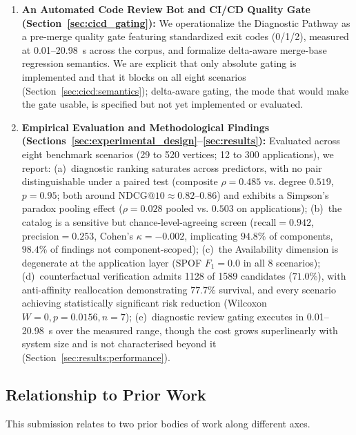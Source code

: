 \begin{enumerate}
    \item \textbf{An Automated Code Review Bot and CI/CD Quality Gate (Section~\ref{sec:cicd_gating}):} We operationalize the Diagnostic Pathway as a pre-merge quality gate featuring standardized exit codes (0/1/2), measured at 0.01--20.98~s across the corpus, and formalize delta-aware merge-base regression semantics. We are explicit that only absolute gating is implemented and that it blocks on all eight scenarios (Section~\ref{sec:cicd:semantics}); delta-aware gating, the mode that would make the gate usable, is specified but not yet implemented or evaluated.
    \item \textbf{Empirical Evaluation and Methodological Findings (Sections~\ref{sec:experimental_design}--\ref{sec:results}):} Evaluated across eight benchmark scenarios (29 to 520 vertices; 12 to 300 applications), we report: (a)~diagnostic ranking saturates across predictors, with no pair distinguishable under a paired test (composite $\rho = 0.485$ vs. degree $0.519$, $p = 0.95$; both around $\mathrm{NDCG@10} \approx 0.82$--$0.86$) and exhibits a Simpson's paradox pooling effect ($\rho = 0.028$ pooled vs. $0.503$ on applications); (b)~the catalog is a sensitive but chance-level-agreeing screen ($\text{recall} = 0.942$, $\text{precision} = 0.253$, Cohen's $\kappa = -0.002$, implicating $94.8\%$ of components, $98.4\%$ of findings not component-scoped); (c)~the Availability dimension is degenerate at the application layer (SPOF $F_1 = 0.0$ in all 8 scenarios); (d)~counterfactual verification admits 1128 of 1589 candidates ($71.0\%$), with anti-affinity reallocation demonstrating $77.7\%$ survival, and every scenario achieving statistically significant risk reduction (Wilcoxon $W=0, p=0.0156, n=7$); (e)~diagnostic review gating executes in 0.01--20.98~s over the measured range, though the cost grows superlinearly with system size and is not characterised beyond it (Section~\ref{sec:results:performance}).
\end{enumerate}

\subsection{Relationship to Prior Work}
\label{sec:intro:prior_work}

This submission relates to two prior bodies of work along different axes.

